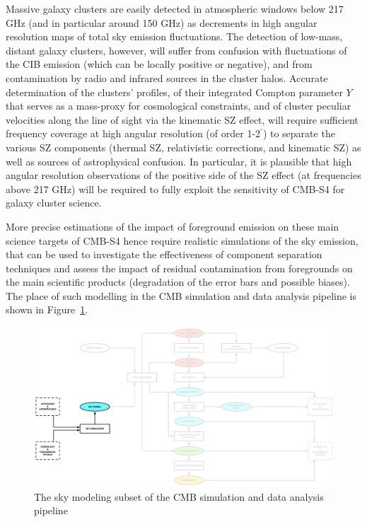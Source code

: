 Massive galaxy clusters are easily detected in atmospheric windows below 217 GHz (and in particular around 150 GHz) as decrements in high angular resolution maps of total sky emission fluctuations. The detection of low-mass, distant galaxy clusters, however, will suffer from confusion with fluctuations of the CIB emission (which can be locally positive or negative), and from contamination by radio and infrared sources in the cluster halos. Accurate determination of the clusters' profiles, of their integrated Compton parameter $Y$ that serves as a mass-proxy for cosmological constraints, and of cluster peculiar velocities along the line of sight via the kinematic SZ effect, will require sufficient frequency coverage at high angular resolution (of order 1-2$^\prime$) to separate the various SZ components (thermal SZ, relativistic corrections, and kinematic SZ) as well as sources of astrophysical confusion. In particular, it is plausible that high angular resolution observations of the positive side of the SZ effect (at frequencies above 217 GHz) will be required to fully exploit the sensitivity of CMB-S4 for galaxy cluster science.

More precise estimations of the impact of foreground emission on these main science targets of CMB-S4 hence require realistic simulations of the sky emission, that can be used to investigate the effectiveness of component separation techniques and assess the impact of residual contamination from foregrounds on the main scientific products (degradation of the error bars and possible biases). The place of such modelling in the CMB simulation and data analysis pipeline is shown in Figure~\ref{fig:skymodel-in-pipeline}.

\begin{figure}[htbp]
\centering
\includegraphics[width=1\textwidth]{Analysis/sm}
\caption{The sky modeling subset of the CMB simulation and data analysis pipeline}
\label{fig:skymodel-in-pipeline}
\end{figure}


